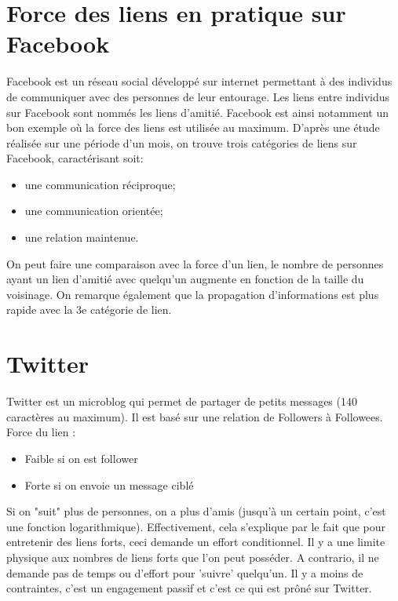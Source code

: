 \section{Force des liens en pratique sur Facebook}
Facebook est un réseau social développé sur internet permettant à des individus de communiquer avec des personnes de leur entourage.
Les liens entre individus sur Facebook sont nommés les liens d'amitié.
Facebook est ainsi notamment un bon exemple où la force des liens est utilisée au maximum.
D'après une étude réalisée sur une période d'un mois, on trouve trois catégories de liens sur Facebook, caractérisant soit:
\begin{itemize}
\item une communication réciproque;
\item une communication orientée;
\item une relation maintenue.\\
\end{itemize}
On peut faire une comparaison avec la force d'un lien, le nombre de personnes ayant un lien d'amitié avec quelqu'un augmente en fonction de la taille du voisinage. 
On remarque également que la propagation d'informations est plus rapide avec la 3e catégorie de lien.
\newline
\section{Twitter}
Twitter est un microblog qui permet de partager de petits messages (140 caractères au maximum). Il est basé sur une relation de Followers à Followees.
Force du lien :
\begin{itemize}
\item Faible si on est follower
\item Forte si on envoie un message ciblé\\
\end{itemize}
Si on "suit" plus de personnes, on a plus d'amis (jusqu'à un certain point, c'est une fonction logarithmique). Effectivement, cela s'explique par le fait que pour entretenir des liens forts, ceci demande un effort conditionnel. Il y a une limite physique aux nombres de liens forts que l'on peut posséder. A contrario, il ne demande pas de temps ou d'effort pour 'suivre' quelqu'un. Il y a moins de contraintes, c'est un engagement passif et c'est ce qui est prôné sur Twitter.